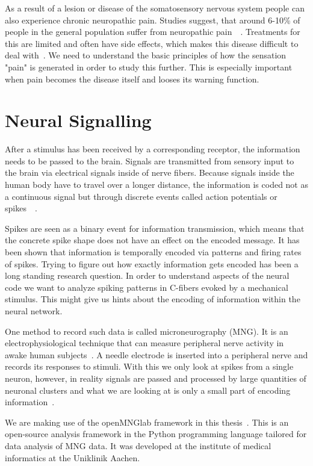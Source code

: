 As a result of a lesion or disease of the somatosensory nervous system people can also experience chronic neuropathic pain. Studies suggest, that around 6-10\% of people in the general population suffer from neuropathic pain~\cite{bouhassira_prevalence_2008}~\cite{van_hecke_neuropathic_2014}. Treatments for this are limited and often have side effects, which makes this disease difficult to deal with~\cite{brooks2017treatments}. We need to understand the basic principles of how the sensation "pain" is generated in order to study this further. This is especially important when pain becomes the disease itself and looses its warning function.

\section{Neural Signalling}
After a stimulus has been received by a corresponding receptor, the information needs to be passed to the brain.
Signals are transmitted from sensory input to the brain via electrical signals inside of nerve fibers. Because signals inside the human body have to travel over a longer distance, the information is coded not as a continuous signal but through discrete events called action potentials or spikes~\cite{rieke1999spikes}~\cite{spikeGeneral}.

Spikes are seen as a binary event for information transmission, which means that the concrete spike shape does not have an effect on the encoded message. It has been shown that information is temporally encoded via patterns and firing rates of spikes. Trying to figure out how exactly information gets encoded has been a long standing research question.
In order to understand aspects of the neural code we want to analyze spiking patterns in C-fibers evoked by a mechanical stimulus. This might give us hints about the encoding of information within the neural network. 

One method to record such data is called microneurography (MNG). It is an electrophysiological technique that can measure peripheral nerve activity in awake human subjects~\cite{namer2009translational}. A needle electrode is inserted into a peripheral nerve and records its responses to stimuli. With this we only look at spikes from a single neuron, however, in reality signals are passed and processed by large quantities of neuronal clusters and what we are looking at is only a small part of encoding information~\cite{spikeGeneral}.

We are making use of the openMNGlab framework in this thesis~\cite{schlebusch_openmnglab_2021}. This is an open-source analysis framework in the Python programming language tailored for data analysis of MNG data. It was developed at the institute of medical informatics at the Uniklinik Aachen.

